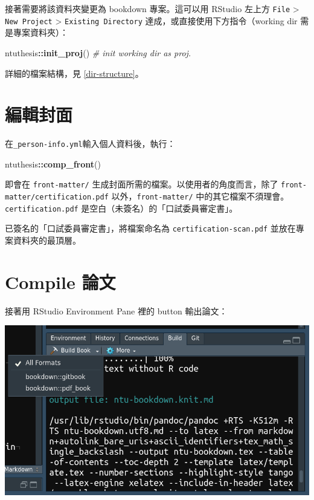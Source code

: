 \documentclass[oneside]{book}
\newenvironment{Shaded}{\begin{snugshade}}{\end{snugshade}}
\newcommand{\KeywordTok}[1]{\textcolor[rgb]{0.13,0.29,0.53}{\textbf{#1}}}
\newcommand{\CommentTok}[1]{\textcolor[rgb]{0.56,0.35,0.01}{\textit{#1}}}
\newcommand{\OperatorTok}[1]{\textcolor[rgb]{0.81,0.36,0.00}{\textbf{#1}}}
\newcommand{\NormalTok}[1]{#1}
\begin{document}
接著需要將該資料夾變更為 bookdown 專案。這可以用 RStudio 左上方
\texttt{File} \textgreater{} \texttt{New\ Project} \textgreater{}
\texttt{Existing\ Directory} 達成，或直接使用下方指令（working dir
需是專案資料夾）：

\begin{Shaded}
\begin{Highlighting}[]
\NormalTok{ntuthesis}\OperatorTok{::}\KeywordTok{init_proj}\NormalTok{()  }\CommentTok{# init working dir as proj.}
\end{Highlighting}
\end{Shaded}

詳細的檔案結構，見 \ref{dir-structure}。

\section{編輯封面}\label{edit-front-matter}

在\texttt{\_person-info.yml}輸入個人資料後，執行：

\begin{Shaded}
\begin{Highlighting}[]
\NormalTok{ntuthesis}\OperatorTok{::}\KeywordTok{comp_front}\NormalTok{()}
\end{Highlighting}
\end{Shaded}

即會在 \texttt{front-matter/}
生成封面所需的檔案。以使用者的角度而言，除了
\texttt{front-matter/certification.pdf} 以外，\texttt{front-matter/}
中的其它檔案不須理會。\texttt{certification.pdf}
是空白（未簽名）的「口試委員審定書」。

已簽名的「口試委員審定書」，將檔案命名為 \texttt{certification-scan.pdf}
並放在專案資料夾的最頂層。

\section{Compile 論文}\label{compile-thesis}

接著用 RStudio Environment Pane 裡的 button 輸出論文：

\begin{center}\includegraphics[width=0.9\linewidth]{figs/build-button} \end{center}
\end{document}
